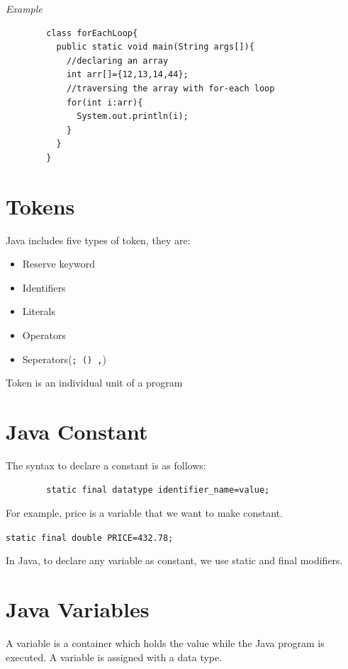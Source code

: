 \documentclass[11pt, a4paper]{book}
\begin{document}
      \emph{Example}
      
      \begin{lstlisting}
        class forEachLoop{  
          public static void main(String args[]){  
            //declaring an array  
            int arr[]={12,13,14,44};  
            //traversing the array with for-each loop  
            for(int i:arr){  
              System.out.println(i);  
            }
          }
        }
      \end{lstlisting}
    
    \section{Tokens}
      Java includes five types of token, they are:
  
      \begin{itemize}
  
        \item Reserve keyword
        \item Identifiers
        \item Literals
        \item Operators
        \item Seperators(\texttt{; () ,})
  
      \end{itemize}
  
      Token is an individual unit of a program
    
    \section{Java Constant}
      The syntax to declare a constant is as follows:
      \begin{lstlisting}
        static final datatype identifier_name=value;
      \end{lstlisting}
      For example, price is a variable that we want to make constant.
      
      \texttt{static final double PRICE=432.78;}
      
      In Java, to declare any variable as constant, we use static and final modifiers.
    
    \section{Java Variables}
      A variable is a container which holds the value while the Java program is executed. A variable is assigned with a data type.
      
\end{document}
